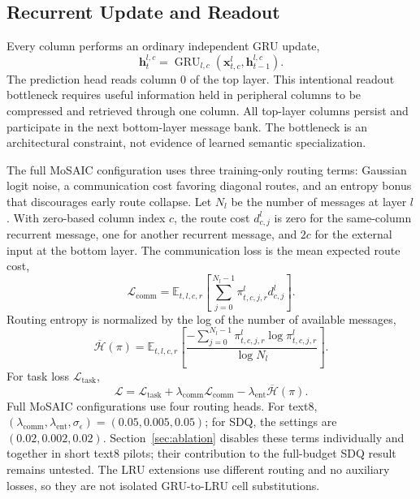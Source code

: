 \documentclass[letterpaper,twoside]{article}
\begin{document}
\subsection{Recurrent Update and Readout}

Every column performs an ordinary independent GRU update,
\begin{equation}
\mathbf{h}_t^{l,c} =
\operatorname{GRU}_{l,c}
(\mathbf{x}_{t,c}^l,\mathbf{h}_{t-1}^{l,c}).
\end{equation}
The prediction head reads column 0 of the top layer. This intentional readout bottleneck requires useful information held in peripheral columns to be compressed and retrieved through one column. All top-layer columns persist and participate in the next bottom-layer message bank. The bottleneck is an architectural constraint, not evidence of learned semantic specialization.

The full MoSAIC configuration uses three training-only routing terms: Gaussian logit noise, a communication cost favoring diagonal routes, and an entropy bonus that discourages early route collapse. Let $N_l$ be the number of messages at layer $l$. With zero-based column index $c$, the route cost $d_{c,j}^l$ is zero for the same-column recurrent message, one for another recurrent message, and $2c$ for the external input at the bottom layer. The communication loss is the mean expected route cost,
\begin{equation}
\mathcal{L}_{\mathrm{comm}}
= \mathbb{E}_{t,l,c,r}\!\left[
\sum_{j=0}^{N_l-1}\pi_{t,c,j,r}^l d_{c,j}^l
\right].
\end{equation}
Routing entropy is normalized by the log of the number of available messages,
\begin{equation}
\overline{\mathcal{H}}(\pi)
= \mathbb{E}_{t,l,c,r}\!\left[
\frac{-\sum_{j=0}^{N_l-1}\pi_{t,c,j,r}^l
\log \pi_{t,c,j,r}^l}{\log N_l}
\right].
\end{equation}
For task loss $\mathcal{L}_{\mathrm{task}}$,
\begin{equation}
\mathcal{L} =
\mathcal{L}_{\mathrm{task}}
+ \lambda_{\mathrm{comm}}\mathcal{L}_{\mathrm{comm}}
- \lambda_{\mathrm{ent}}\overline{\mathcal{H}}(\pi).
\end{equation}
Full MoSAIC configurations use four routing heads. For text8, $(\lambda_{\mathrm{comm}},\lambda_{\mathrm{ent}},\sigma_\epsilon)=(0.05,0.005,0.05)$; for SDQ, the settings are $(0.02,0.002,0.02)$. Section~\ref{sec:ablation} disables these terms individually and together in short text8 pilots; their contribution to the full-budget SDQ result remains untested. The LRU extensions use different routing and no auxiliary losses, so they are not isolated GRU-to-LRU cell substitutions.
\end{document}
